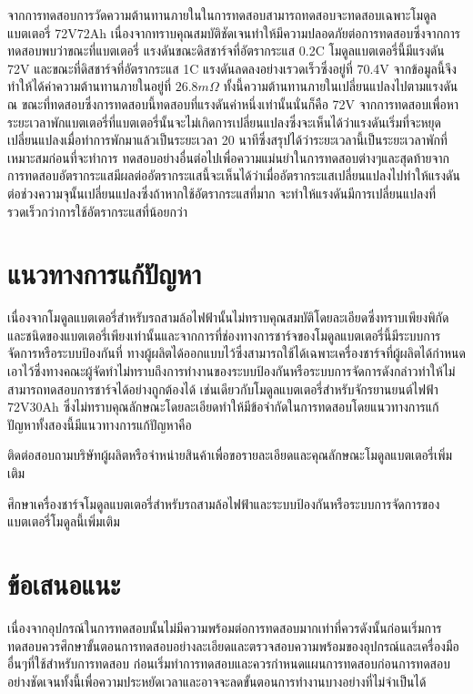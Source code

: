 จากการทดสอบการวัดความต้านทานภายในในการทดสอบสามารถทดสอบจะทดสอบเฉพาะโมดูลแบตเตอรี่ 72V72Ah เนื่องจากทราบคุณสมบัติชัดเจนทำให้มีความปลอดภัยต่อการทดสอบซึ่งจากการทดสอบพบว่าขณะที่แบตเตอรี่
แรงดันขณะดิสชาร์จที่อัตรากระแส 0.2C โมดูลแบตเตอรี่นี้มีแรงดัน 72V และขณะที่ดิสชาร์จที่อัตรากระแส 1C แรงดันลดลงอย่างเรวดเร็วซึ่งอยู่ที่ 70.4V จากข้อมูลนี้จึงทำให้ได้ค่าความต้านทานภายในอยู่ที่
$26.8 m\Omega $ ทั้งนี้ความต้านทานภายในเปลี่ยนแปลงไปตามแรงดัน ณ ขณะที่ทดสอบซึ่งการทดสอบนี้ทดสอบที่แรงดันค่าหนึ่งเท่านั้นนั่นก็คือ 72V
\newline
\hspace*{2cm}
จากการทดสอบเพื่อหาระยะเวลาพักแบตเตอรี่ที่แบตเตอรี่นั้นจะไม่เกิดการเปลี่ยนแปลงซึ่งจะเห็นได้ว่าแรงดันเริ่มที่จะหยุดเปลี่ยนแปลงเมื่อทำการพักมาแล้วเป็นระยะเวลา 20 นาทีซึ่งสรุปได้ว่าระยะเวลานี้เป็นระยะเวลาพักที่เหมาะสมก่อนที่จะทำการ
ทดสอบอย่างอื่นต่อไปเพื่อความแม่นยำในการทดสอบต่างๆและสุดท้ายจากการทดสอบอัตรากระแสมีผลต่ออัตรากระแสนี้จะเห็นได้ว่าเมื่ออัตรากระแสเปลี่ยนแปลงไปทำให้แรงดันต่อช่วงความจุนั้นเปลี่ยนแปลงซึ่งถ้าหากใช้อัตรากระแสที่มาก
จะทำให้แรงดันมีการเปลี่ยนแปลงที่รวดเร็วกว่าการใช้อัตรากระแสที่น้อยกว่า
\section{แนวทางการแก้ปัญหา}
เนื่องจากโมดูลแบตเตอรี่สำหรับรถสามล้อไฟฟ้านั้นไม่ทราบคุณสมบัติโดยละเอียดซึ่งทราบเพียงพิกัดและชนิดของแบตเตอรี่เพียงเท่านั้นและจากการที่ช่องทางการชาร์จของโมดูลแบตเตอรี่นี้มีระบบการจัดการหรือระบบป้องกันที่
ทางผู้ผลิตได้ออกแบบไว้ซึ่งสามารถใช้ได้เฉพาะเครื่องชาร์จที่ผู้ผลิตได้กำหนดเอาไว้ซึ่งทางคณะผู้จัดทำไม่ทราบถึงการทำงานของระบบป้องกันหรือระบบการจัดการดังกล่าวทำให้ไม่สามารถทดสอบการชาร์จได้อย่างถูกต้องได้
เช่นเดียวกับโมดูลแบตเตอรี่สำหรับจักรยานยนต์ไฟฟ้า 72V30Ah ซึ่งไม่ทราบคุณลักษณะโดยละเอียดทำให้มีข้อจำกัดในการทดสอบโดยแนวทางการแก้ปัญหาทั้งสองนี้มีแนวทางการแก้ปัญหาคือ
\begin{itemize}
{\item ติดต่อสอบถามบริษัทผู้ผลิตหรือจำหน่ายสินค้าเพื่อขอรายละเอียดและคุณลักษณะโมดูลแบตเตอรี่เพิ่มเติม}
{\item ศึกษาเครื่องชาร์จโมดูลแบตเตอรี่สำหรับรถสามล้อไฟฟ้าและระบบป้องกันหรือระบบการจัดการของแบตเตอรี่โมดูลนี้เพิ่มเติม}
\end{itemize}
\section{ข้อเสนอแนะ}
เนื่องจากอุปกรณ์ในการทดสอบนั้นไม่มีความพร้อมต่อการทดสอบมากเท่าที่ควรดังนั้นก่อนเริ่มการทดสอบควรศึกษาขั้นตอนการทดสอบอย่างละเอียดและตรวจสอบความพร้อมของอุปกรณ์และเครื่องมืออื่นๆที่ใช้สำหรับการทดสอบ
ก่อนเริ่มทำการทดสอบและควรกำหนดแผนการทดสอบก่อนการทดสอบอย่างชัดเจนทั้งนี้เพื่อความประหยัดเวลาและอาจจะลดขั้นตอนการทำงานบางอย่างที่ไม่จำเป็นได้












